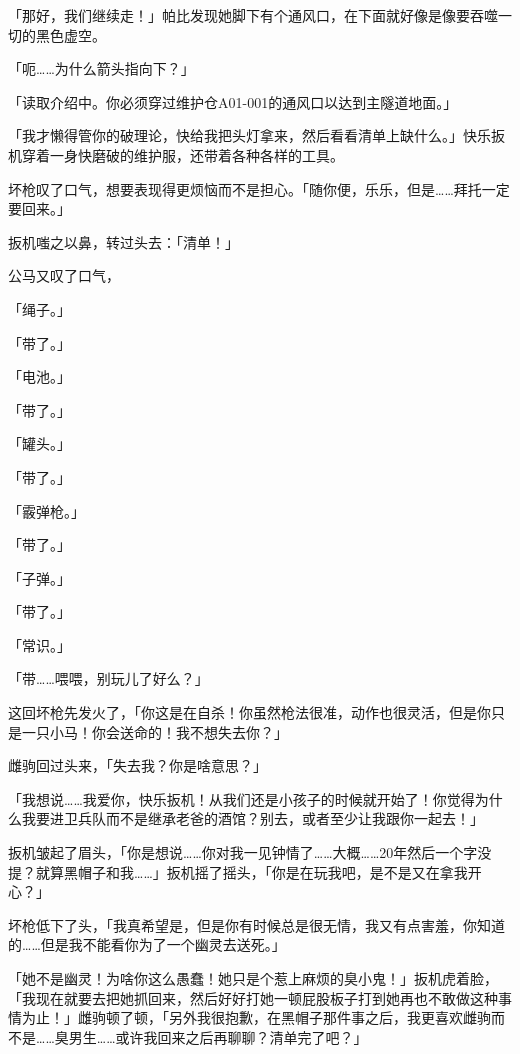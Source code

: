 「那好，我们继续走！」帕比发现她脚下有个通风口，在下面就好像是像要吞噬一切的黑色虚空。

「呃……为什么箭头指向下？」

「{\mt 读取介绍中。你必须穿过维护仓A01-001的通风口以达到主隧道地面。}」

\horizonline


「我才懒得管你的破理论，快给我把头灯拿来，然后看看清单上缺什么。」快乐扳机穿着一身快磨破的维护服，还带着各种各样的工具。

坏枪叹了口气，想要表现得更烦恼而不是担心。「随你便，乐乐，但是……拜托一定要回来。」

扳机嗤之以鼻，转过头去：「清单！」

公马又叹了口气，

「绳子。」

「带了。」

「电池。」

「带了。」

「罐头。」

「带了。」

「霰弹枪。」

「带了。」

「子弹。」

「带了。」

「常识。」

「带……喂喂，别玩儿了好么？」

这回坏枪先发火了，「你这是在自杀！你虽然枪法很准，动作也很灵活，但是你只是一只小马！你会送命的！我不想失去你？」

雌驹回过头来，「失去我？你是啥意思？」

「我想说……我爱你，快乐扳机！从我们还是小孩子的时候就开始了！你觉得为什么我要进卫兵队而不是继承老爸的酒馆？别去，或者至少让我跟你一起去！」

扳机皱起了眉头，「你是想说……你对我一见钟情了……大概……20年然后一个字没提？就算黑帽子和我……」扳机摇了摇头，「你是在玩我吧，是不是又在拿我开心？」

坏枪低下了头，「我真希望是，但是你有时候总是很无情，我又有点害羞，你知道的……但是我不能看你为了一个幽灵去送死。」

「她不是幽灵！为啥你这么愚蠢！她只是个惹上麻烦的臭小鬼！」扳机虎着脸，「我现在就要去把她抓回来，然后好好打她一顿屁股板子打到她再也不敢做这种事情为止！」雌驹顿了顿，「另外我很抱歉，在黑帽子那件事之后，我更喜欢雌驹而不是……臭男生……或许我回来之后再聊聊？清单完了吧？」

